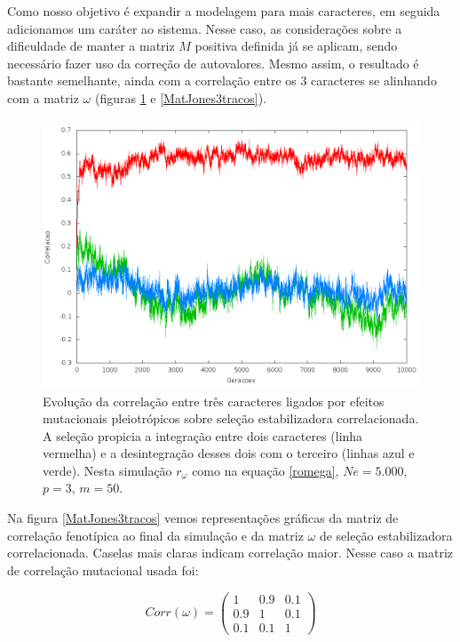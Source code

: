 Como nosso objetivo é expandir a modelagem para mais caracteres, em seguida
adicionamos um caráter ao sistema. 
Nesse caso, as considerações sobre a dificuldade de manter a matriz $M$
positiva definida já se aplicam, sendo necessário fazer uso da correção
de autovalores. 
Mesmo assim, o resultado é bastante semelhante, ainda com a correlação
entre os 3 caracteres se alinhando com a matriz $\omega$ (figuras
\ref{jones3tracos} e \ref{MatJones3tracos}). 


\begin{figure}[htbp]
  \centering
  \includegraphics[width=150mm, height=80mm]{figuras/jones3tracos.png}
  \caption{Evolução da correlação entre três caracteres ligados por efeitos
  mutacionais pleiotrópicos sobre seleção estabilizadora correlacionada.
  A seleção propicia a integração entre dois caracteres (linha vermelha) e a desintegração
  desses dois com o terceiro (linhas azul e verde). Nesta simulação
  $r_\omega$ como na equação \ref{romega}, $Ne=5.000$, $p=3$, $m=50$.}
  \label{jones3tracos}
\end{figure}


Na figura \ref{MatJones3tracos} vemos representações gráficas da matriz
de correlação fenotípica ao final da simulação e da matriz $\omega$ de
seleção estabilizadora correlacionada. 
Caselas mais claras indicam correlação maior. 
Nesse caso a matriz de correlação mutacional usada foi:

\begin{equation}
Corr(\omega) = \left( \begin{smallmatrix} 1 & 0.9 & 0.1\\  0.9 & 1 & 0.1 \\ 0.1 & 0.1 & 1 \end{smallmatrix}  \right)
\label{romega}
\end{equation}

